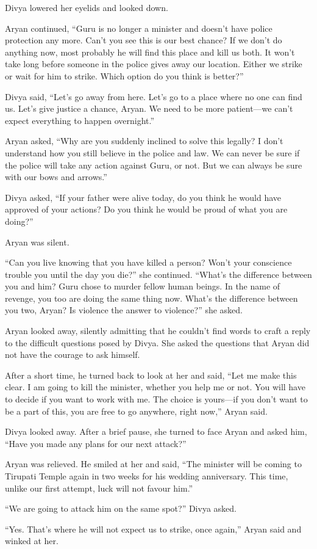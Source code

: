 Divya lowered her eyelids and looked down.

Aryan continued, “Guru is no longer a minister and doesn't have police
protection any more. Can't you see this is our best chance? If we don't do
anything now, most probably he will find this place and kill us both. It won't
take long before someone in the police gives away our location. Either we
strike or wait for him to strike. Which option do you think is better?”

Divya said, “Let's go away from here. Let's go to a place where no one can
find us. Let's give justice a chance, Aryan. We need to be more patient—we
can't expect everything to happen overnight.”

Aryan asked, “Why are you suddenly inclined to solve this legally? I don't
understand how you still believe in the police and law. We can never be sure if
the police will take any action against Guru, or not. But we can always be sure
with our bows and arrows.”

Divya asked, “If your father were alive today, do you think he would have
approved of your actions? Do you think he would be proud of what you are doing?”

Aryan was silent.

“Can you live knowing that you have killed a person? Won't your conscience
trouble you until the day you die?” she continued. “What's the difference
between you and him? Guru chose to murder fellow human beings. In the name of
revenge, you too are doing the same thing now. What's the difference between you
two, Aryan? Is violence the answer to violence?” she asked.

Aryan looked away, silently admitting that he couldn't find words to craft a
reply to the difficult questions posed by Divya. She asked the questions
that Aryan did not have the courage to ask himself.

After a short time, he turned back to look at her and said, “Let me make this
clear. I am going to kill the minister, whether you help me or not. You will have
to decide if you want to work with me. The choice is yours—if you don't
want to be a part of this, you are free to go anywhere, right now,” Aryan said.

Divya looked away. After a brief pause, she turned to face Aryan and asked him,
“Have you made any plans for our next attack?”

Aryan was relieved. He smiled at her and said, “The minister will be coming to
Tirupati Temple again in two weeks for his wedding anniversary. This time,
unlike our first attempt, luck will not favour him.”

“We are going to attack him on the same spot?” Divya asked.

“Yes. That's where he will not expect us to strike, once again,” Aryan said and
winked at her.